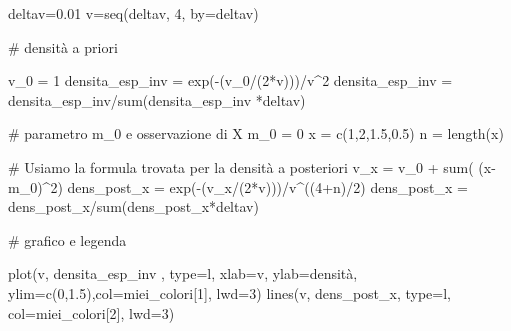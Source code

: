 \documentclass[
  italian,
  letterpaper,
]{book}
\newenvironment{Shaded}{\begin{snugshade}}{\end{snugshade}}
\newcommand{\AttributeTok}[1]{\textcolor[rgb]{0.40,0.45,0.13}{#1}}
\newcommand{\CommentTok}[1]{\textcolor[rgb]{0.37,0.37,0.37}{#1}}
\newcommand{\DecValTok}[1]{\textcolor[rgb]{0.68,0.00,0.00}{#1}}
\newcommand{\FloatTok}[1]{\textcolor[rgb]{0.68,0.00,0.00}{#1}}
\newcommand{\FunctionTok}[1]{\textcolor[rgb]{0.28,0.35,0.67}{#1}}
\newcommand{\NormalTok}[1]{\textcolor[rgb]{0.00,0.23,0.31}{#1}}
\newcommand{\OtherTok}[1]{\textcolor[rgb]{0.00,0.23,0.31}{#1}}
\newcommand{\SpecialCharTok}[1]{\textcolor[rgb]{0.37,0.37,0.37}{#1}}
\newcommand{\StringTok}[1]{\textcolor[rgb]{0.13,0.47,0.30}{#1}}
\theoremstyle{definition}
\theoremstyle{remark}
\begin{document}
\begin{Shaded}
\begin{Highlighting}[]
\NormalTok{deltav}\OtherTok{=}\FloatTok{0.01}
\NormalTok{v}\OtherTok{=}\FunctionTok{seq}\NormalTok{(deltav, }\DecValTok{4}\NormalTok{, }\AttributeTok{by=}\NormalTok{deltav)}

\CommentTok{\# densità a priori}

\NormalTok{v\_0 }\OtherTok{=} \DecValTok{1}
\NormalTok{densita\_esp\_inv }\OtherTok{=} \FunctionTok{exp}\NormalTok{(}\SpecialCharTok{{-}}\NormalTok{(v\_0}\SpecialCharTok{/}\NormalTok{(}\DecValTok{2}\SpecialCharTok{*}\NormalTok{v)))}\SpecialCharTok{/}\NormalTok{v}\SpecialCharTok{\^{}}\DecValTok{2}
\NormalTok{densita\_esp\_inv }\OtherTok{=}\NormalTok{ densita\_esp\_inv}\SpecialCharTok{/}\FunctionTok{sum}\NormalTok{(densita\_esp\_inv }\SpecialCharTok{*}\NormalTok{deltav)}


\CommentTok{\# parametro m\_0 e osservazione di X}
\NormalTok{m\_0 }\OtherTok{=} \DecValTok{0}
\NormalTok{x }\OtherTok{=} \FunctionTok{c}\NormalTok{(}\DecValTok{1}\NormalTok{,}\DecValTok{2}\NormalTok{,}\FloatTok{1.5}\NormalTok{,}\FloatTok{0.5}\NormalTok{)}
\NormalTok{n }\OtherTok{=} \FunctionTok{length}\NormalTok{(x)}

\CommentTok{\# Usiamo la formula trovata per la densità a posteriori}
\NormalTok{v\_x }\OtherTok{=}\NormalTok{ v\_0 }\SpecialCharTok{+} \FunctionTok{sum}\NormalTok{( (x}\SpecialCharTok{{-}}\NormalTok{m\_0)}\SpecialCharTok{\^{}}\DecValTok{2}\NormalTok{)}
\NormalTok{dens\_post\_x }\OtherTok{=} \FunctionTok{exp}\NormalTok{(}\SpecialCharTok{{-}}\NormalTok{(v\_x}\SpecialCharTok{/}\NormalTok{(}\DecValTok{2}\SpecialCharTok{*}\NormalTok{v)))}\SpecialCharTok{/}\NormalTok{v}\SpecialCharTok{\^{}}\NormalTok{((}\DecValTok{4}\SpecialCharTok{+}\NormalTok{n)}\SpecialCharTok{/}\DecValTok{2}\NormalTok{)}
\NormalTok{dens\_post\_x }\OtherTok{=}\NormalTok{ dens\_post\_x}\SpecialCharTok{/}\FunctionTok{sum}\NormalTok{(dens\_post\_x}\SpecialCharTok{*}\NormalTok{deltav)}

\CommentTok{\# grafico e legenda}

\FunctionTok{plot}\NormalTok{(v, densita\_esp\_inv , }\AttributeTok{type=}\StringTok{\textquotesingle{}l\textquotesingle{}}\NormalTok{, }\AttributeTok{xlab=}\StringTok{\textquotesingle{}v\textquotesingle{}}\NormalTok{, }\AttributeTok{ylab=}\StringTok{\textquotesingle{}densità\textquotesingle{}}\NormalTok{, }\AttributeTok{ylim=}\FunctionTok{c}\NormalTok{(}\DecValTok{0}\NormalTok{,}\FloatTok{1.5}\NormalTok{),}\AttributeTok{col=}\NormalTok{miei\_colori[}\DecValTok{1}\NormalTok{], }\AttributeTok{lwd=}\DecValTok{3}\NormalTok{)}
\FunctionTok{lines}\NormalTok{(v, dens\_post\_x, }\AttributeTok{type=}\StringTok{\textquotesingle{}l\textquotesingle{}}\NormalTok{, }\AttributeTok{col=}\NormalTok{miei\_colori[}\DecValTok{2}\NormalTok{], }\AttributeTok{lwd=}\DecValTok{3}\NormalTok{)}




\end{Highlighting}
\end{Shaded}
\end{document}
